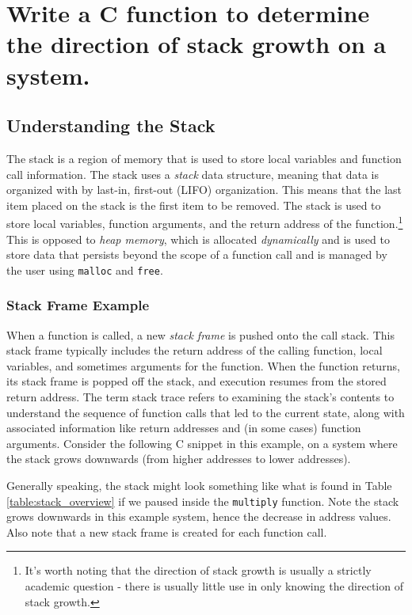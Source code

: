\documentclass[main.tex]{subfiles}
\begin{document}
\section{Write a C function to determine the direction of stack growth on a system.}

\spoilerline

\subsection{Understanding the Stack}
The stack is a region of memory that is used to store local variables and function call information. The stack uses a \textit{stack} data structure, meaning that data is organized with by last-in, first-out (LIFO) organization. This means that the last item placed on the stack is the first item to be removed. The stack is used to store local variables, function arguments, and the return address of the function.\footnote{It's worth noting that the direction of stack growth is usually a strictly academic question - there is usually little use in only knowing the direction of stack growth.} This is opposed to \textit{heap memory}, which is allocated \textit{dynamically} and is used to store data that persists beyond the scope of a function call and is managed by the user using \texttt{malloc} and \texttt{free}.

\subsubsection{Stack Frame Example}
When a function is called, a new \textit{stack frame} is pushed onto the call stack. This stack frame typically includes the return address of the calling function, local variables, and sometimes arguments for the function. When the function returns, its stack frame is popped off the stack, and execution resumes from the stored return address. The term stack trace refers to examining the stack's contents to understand the sequence of function calls that led to the current state, along with associated information like return addresses and (in some cases) function arguments.
\newline
\newnoindentpara Consider the following C snippet in this example, on a system where the stack grows downwards (from higher addresses to lower addresses). 


\noindent Generally speaking, the stack might look something like what is found in Table \ref{table:stack_overview} if we paused inside the \texttt{multiply} function. Note the stack grows downwards in this example system, hence the decrease in address values. Also note that a new stack frame is created for each function call.
\end{document}
